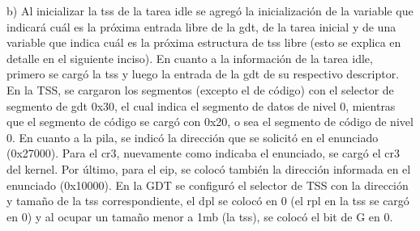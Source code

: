 \documentclass[a4paper]{article}
\begin{document}
b) Al inicializar la tss de la tarea idle se agregó la inicialización de la variable que indicará cuál es la próxima entrada libre de la gdt, de la tarea inicial y
de una variable que indica cuál es la próxima estructura de tss libre (esto se explica en detalle en el siguiente inciso).
En cuanto a la información de la tarea idle, primero se cargó la tss y luego la entrada de la gdt de su respectivo descriptor.
En la TSS, se cargaron los segmentos (excepto el de código) con el selector de segmento de gdt 0x30, el cual indica el segmento de datos de nivel 0, mientras que el
segmento de código se cargó con 0x20, o sea el segmento de código de nivel 0. En cuanto a la pila, se indicó la dirección que se solicitó en el enunciado (0x27000).
Para el cr3, nuevamente como indicaba el enunciado, se cargó el cr3 del kernel. Por último, para el eip, se colocó también la dirección informada en el enunciado (0x10000).
En la GDT se configuró el selector de TSS con la dirección y tamaño de la tss correspondiente, el dpl se colocó en 0 (el rpl en la tss se cargó en 0) y al ocupar
un tamaño menor a 1mb (la tss), se colocó el bit de G en 0.
\end{document}
